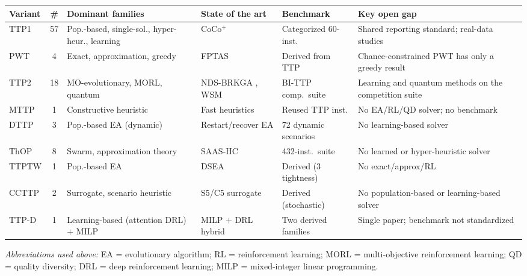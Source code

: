 \begin{center}
\footnotesize
{}
\label{tab:glance}
\setlength{\tabcolsep}{3pt}
\begin{tabular}{@{}lcp{5.5cm}p{4.5cm}p{3.0cm}p{5.0cm}@{}}
\toprule
\textbf{Variant} & \textbf{\#} & \textbf{Dominant families} & \textbf{State of the art} & \textbf{Benchmark} & \textbf{Key open gap} \\
\midrule
TTP1 & 57 & Pop.-based, single-sol., hyper-heur., learning & CoCo$^+$ \citep{namazi2023solving} & Categorized 60-inst. & Shared reporting standard; real-data studies \\
PWT & 4 & Exact, approximation, greedy & FPTAS \citep{neumann2019fully} & Derived from TTP & Chance-constrained PWT has only a greedy result \\
TTP2 & 18 & MO-evolutionary, MORL, quantum & NDS-BRKGA \citep{chagas2021non}, WSM \citep{chagas2022weighted} & BI-TTP comp.\ suite & Learning and quantum methods on the competition suite \\
MTTP & 1 & Constructive heuristic & Fast heuristics \citep{chand2016fast} & Reused TTP inst. & No EA/RL/QD solver; no benchmark \\
DTTP & 3 & Pop.-based EA (dynamic) & Restart/recover EA \citep{sachdeva2020dynamic} & 72 dynamic scenarios & No learning-based solver \\
ThOP & 8 & Swarm, approximation theory & SAAS-HC \citep{huynh2023self} & 432-inst.\ suite & No learned or hyper-heuristic solver \\
TTPTW & 1 & Pop.-based EA & DSEA \citep{angmalisang2026traveling} & Derived (3 tightness) & No exact/approx/RL \\
CCTTP & 2 & Surrogate, scenario heuristic & S5/C5 surrogate \citep{pathirage2024chance} & Derived (stochastic) & No population-based or learning-based solver \\
TTP-D & 1 & Learning-based (attention DRL) $+$ MILP & MILP $+$ DRL hybrid \citep{murjani2026drive} & Two derived families & Single paper; benchmark not standardized \\
\bottomrule
\end{tabular}
\vspace{2pt}

\footnotesize\emph{Abbreviations used above:} EA = evolutionary algorithm; RL = reinforcement learning; MORL = multi-objective reinforcement learning; QD = quality diversity; DRL = deep reinforcement learning; MILP = mixed-integer linear programming.
\end{center}
